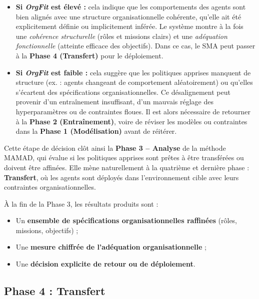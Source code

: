\documentclass[pdflatex,sn-mathphys-num]{sn-jnl}%
\theoremstyle{thmstyleone}%
\theoremstyle{thmstyletwo}%
\theoremstyle{thmstylethree}%
\begin{document}
\begin{itemize}
    \item \textbf{Si \textit{OrgFit} est élevé :} cela indique que les comportements des agents sont bien alignés avec une structure organisationnelle cohérente, qu'elle ait été explicitement définie ou implicitement inférée. Le système montre à la fois une \textit{cohérence structurelle} (rôles et missions clairs) et une \textit{adéquation fonctionnelle} (atteinte efficace des objectifs). Dans ce cas, le SMA peut passer à la \textbf{Phase 4 (Transfert)} pour le déploiement.
          
    \item \textbf{Si \textit{OrgFit} est faible :} cela suggère que les politiques apprises manquent de structure (ex. : agents changeant de comportement aléatoirement) ou qu'elles s'écartent des spécifications organisationnelles. Ce désalignement peut provenir d'un entraînement insuffisant, d'un mauvais réglage des hyperparamètres ou de contraintes floues. Il est alors nécessaire de retourner à la \textbf{Phase 2 (Entraînement)}, voire de réviser les modèles ou contraintes dans la \textbf{Phase 1 (Modélisation)} avant de réitérer.
\end{itemize}

\vspace{0.4em}
\noindent Cette étape de décision clôt ainsi la \textbf{Phase 3 – Analyse} de la méthode MAMAD, qui évalue si les politiques apprises sont prêtes à être transférées ou doivent être affinées. Elle mène naturellement à la quatrième et dernière phase : \textbf{Transfert}, où les agents sont déployés dans l'environnement cible avec leurs contraintes organisationnelles.

\vspace{0.4em}
\noindent À la fin de la Phase 3, les résultats produits sont :
\begin{itemize}
    \item Un \textbf{ensemble de spécifications organisationnelles raffinées} (rôles, missions, objectifs) ;
    \item Une \textbf{mesure chiffrée de l'adéquation organisationnelle} ;
    \item Une \textbf{décision explicite de retour ou de déploiement}.
\end{itemize}

\subsection{Phase 4 : Transfert}
\end{document}
